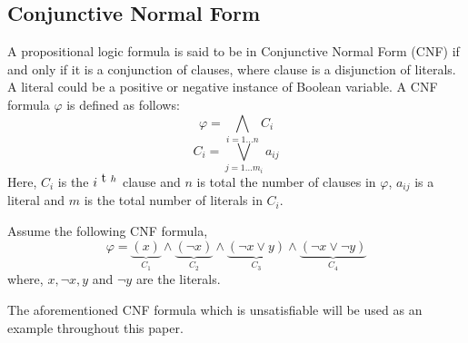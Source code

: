 \subsection{Conjunctive Normal Form}
A propositional logic formula is said to be in Conjunctive Normal Form (CNF) if and only if it is a conjunction of clauses, where clause is a disjunction of literals. A literal could be a positive or negative instance of Boolean variable. A CNF formula $\varphi$ is defined as follows:
$$\varphi = \bigwedge\limits_{i=1\ldots n} C_{i}$$
$$ C_{i} = \bigvee\limits_{j=1\ldots m_{i}} a_{ij}$$
Here, $C_{i}$ is the $i^{\text th}$ clause and $n$ is total the number of clauses in $\varphi$, $a_{ij}$ is a literal and $m$ is the total number of literals in $C_{i}$.\newline
\begin{example}
	\label{cnf}
	Assume the following CNF formula,
	$$\varphi=\underbrace{(x)}\limits_{C_{1}}\wedge\underbrace{(\neg x)}\limits_{C_2}\wedge\underbrace{(\neg x\vee y)}\limits_{C_{3}}\wedge\underbrace{(\neg x \vee \neg y)}\limits_{C_{4}}$$
	where, $x, \neg x, y$ and $\neg y$ are the literals.
\end{example}

The aforementioned CNF formula which is unsatisfiable will be used as an example throughout this paper.
